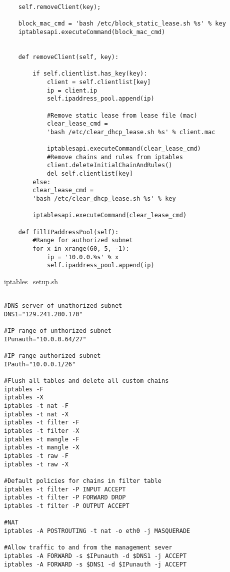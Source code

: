 \begin{appendices}
\begin{algorithm}[h]
\begin{verbatim}
	self.removeClient(key);
	
	block_mac_cmd = 'bash /etc/block_static_lease.sh %s' % key
	iptablesapi.executeCommand(block_mac_cmd)
		
    
    def removeClient(self, key):
        
        if self.clientlist.has_key(key):
            client = self.clientlist[key]
            ip = client.ip
            self.ipaddress_pool.append(ip)
            
            #Remove static lease from lease file (mac) 
            clear_lease_cmd = 
            'bash /etc/clear_dhcp_lease.sh %s' % client.mac
            
            iptablesapi.executeCommand(clear_lease_cmd)
            #Remove chains and rules from iptables 
            client.deleteInitialChainAndRules()
            del self.clientlist[key]
    	else:
		clear_lease_cmd = 
		'bash /etc/clear_dhcp_lease.sh %s' % key

		iptablesapi.executeCommand(clear_lease_cmd)
    
    def fillIPaddressPool(self):
        #Range for authorized subnet
        for x in xrange(60, 5, -1):
            ip = '10.0.0.%s' % x
            self.ipaddress_pool.append(ip)

 \end{verbatim}
\end{algorithm}

\begin{algorithm}[h]
  \caption{iptables\_setup.sh}
  \label{code:iptables_setup}
  \begin{verbatim}
  
#DNS server of unathorized subnet
DNS1="129.241.200.170"

#IP range of unthorized subnet
IPunauth="10.0.0.64/27"

#IP range authorized subnet
IPauth="10.0.0.1/26"

#Flush all tables and delete all custom chains
iptables -F
iptables -X
iptables -t nat -F
iptables -t nat -X
iptables -t filter -F
iptables -t filter -X
iptables -t mangle -F
iptables -t mangle -X
iptables -t raw -F
iptables -t raw -X

#Default policies for chains in filter table
iptables -t filter -P INPUT ACCEPT
iptables -t filter -P FORWARD DROP
iptables -t filter -P OUTPUT ACCEPT

#NAT
iptables -A POSTROUTING -t nat -o eth0 -j MASQUERADE

#Allow traffic to and from the management sever
iptables -A FORWARD -s $IPunauth -d $DNS1 -j ACCEPT
iptables -A FORWARD -s $DNS1 -d $IPunauth -j ACCEPT


\end{verbatim}
\end{algorithm}
\end{appendices}
